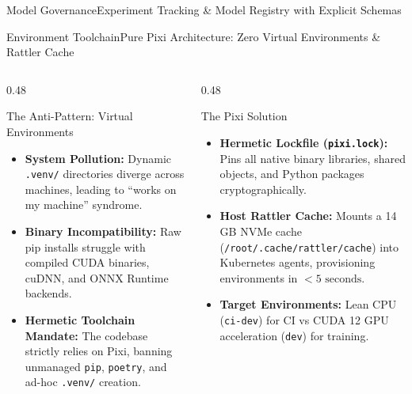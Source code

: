 \begin{frame}{Model Governance}{Experiment Tracking \& Model Registry with Explicit Schemas}
\end{frame}

\begin{frame}{Environment Toolchain}{Pure Pixi Architecture: Zero Virtual Environments \& Rattler Cache}
    \begin{columns}[T]
        \begin{column}{0.48\textwidth}
            \begin{block}{The Anti-Pattern: Virtual Environments}
                \begin{itemize}\footnotesize
                    \item \textbf{System Pollution:} Dynamic \texttt{.venv/} directories diverge across machines, leading to ``works on my machine'' syndrome.
                    \item \textbf{Binary Incompatibility:} Raw pip installs struggle with compiled CUDA binaries, cuDNN, and ONNX Runtime backends.
                    \item \textbf{Hermetic Toolchain Mandate:} The codebase strictly relies on Pixi, banning unmanaged \texttt{pip}, \texttt{poetry}, and ad-hoc \texttt{.venv/} creation.
                \end{itemize}
            \end{block}
        \end{column}
        \begin{column}{0.48\textwidth}
            \begin{block}{The Pixi Solution}
                \begin{itemize}\footnotesize
                    \item \textbf{Hermetic Lockfile (\texttt{pixi.lock}):} Pins all native binary libraries, shared objects, and Python packages cryptographically.
                    \item \textbf{Host Rattler Cache:} Mounts a 14 GB NVMe cache (\texttt{/root/.cache/rattler/cache}) into Kubernetes agents, provisioning environments in $< 5\text{ seconds}$.
                    \item \textbf{Target Environments:} Lean CPU (\texttt{ci-dev}) for CI vs CUDA 12 GPU acceleration (\texttt{dev}) for training.
                \end{itemize}
            \end{block}
        \end{column}
    \end{columns}


\end{frame}
